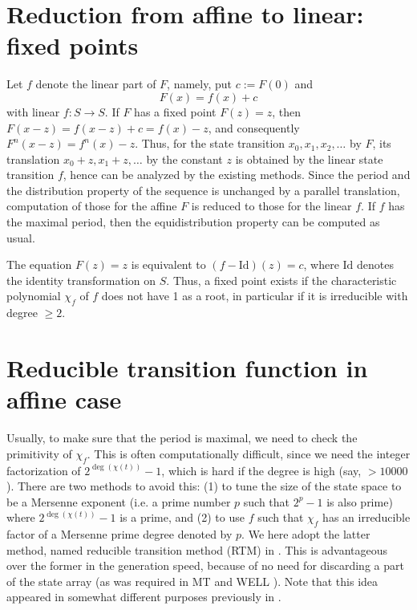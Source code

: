 \documentclass{svmult}
\begin{document}
\section{Reduction from affine to linear: fixed points}
\label{sec:fixed-point}
Let $f$ denote the linear part of $F$,
namely, put $c:=F(0)$ and
\begin{equation}
F(x) = f(x) + c
\end{equation}
with linear $f: S \to S$.
If $F$ has a fixed point
$F(z)=z$, then $F(x-z)=f(x-z)+c=f(x)-z$, and
consequently $F^n(x-z)=f^n(x)-z$.
Thus, for the state transition $x_0,x_1,x_2,\ldots$ by $F$,
its translation $x_0+z, x_1+z, \ldots$ by the constant $z$
is obtained by the linear state transition $f$, hence can be analyzed
by the existing methods.
Since the period and the distribution property of the
sequence is unchanged by a parallel translation,
computation of those for the affine $F$ is
reduced to those for the linear $f$. If $f$ has the maximal period,
then the equidistribution property can be computed as usual.

The equation $F(z)=z$ is equivalent to $(f-\textrm{Id})(z)=c$,
where $\textrm{Id}$ denotes the identity transformation on
$S$.
Thus, a fixed point exists
if the characteristic polynomial $\chi_f$ of $f$
does not have 1 as a root,
in particular if it is irreducible with degree $\geq 2$.

\section{Reducible transition function in affine case}
\label{sec:RTM}
Usually, to make sure that the period is maximal, we need to check
the primitivity of $\chi_f$.
This is often computationally difficult,
since we need the integer factorization of
$2^{\deg(\chi(t))}-1$, which is hard if the degree is high (say, $>10000$).
There are two methods to avoid this: (1) to tune the size of the state space
to be a Mersenne exponent (i.e. a prime number $p$
such that $2^p-1$ is also prime) where $2^{\deg(\chi(t))}-1$ is a prime,
and (2) to use $f$ such that $\chi_f$ has an irreducible factor
of a Mersenne prime degree denoted by $p$. We here adopt the latter
method, named reducible transition method (RTM) in \cite{SFMT}.
This is advantageous over
the former in the generation speed, because of no need for discarding
a part of the state array (as was required in MT \cite{MT} and WELL \cite{WELL}).
Note that this idea appeared in somewhat different purposes previously in
 \cite{FUSHIMI90}\cite{BRENT}\cite{BRENT-PRIM}.
\end{document}
